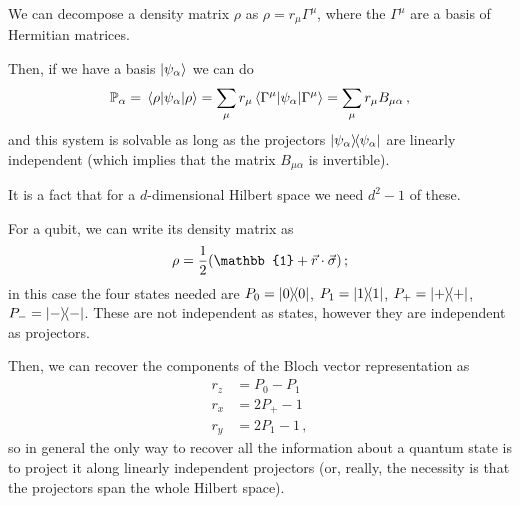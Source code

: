 \documentclass[main.tex]{subfiles}
\begin{document}
We can decompose a density matrix \(\rho \) as \(\rho = r_{\mu } \Gamma^{\mu }\), where the \(\Gamma^{\mu }\) are a basis of Hermitian matrices. 

Then, if we have a basis \(\ket{\psi_{\alpha }}\) we can do 
%
\begin{align}
\mathbb{P}_{\alpha } = \ev{\psi_{\alpha }}{\rho }
= \sum_{\mu } r_{\mu } \ev{\psi_{\alpha }}{\Gamma^{\mu }}
= \sum_{\mu } r_{\mu } B_{\mu \alpha }
\,,
\end{align}
%
and this system is solvable as long as the projectors \(\dyad{\psi_{\alpha }}\) are linearly independent (which implies that the matrix \(B_{\mu \alpha }\) is invertible). 

It is a fact that for a \(d\)-dimensional Hilbert space we need \(d^2-1\) of these. 

For a qubit, we can write its density matrix as 
%
\begin{align}
\rho = \frac{1}{2} \qty(\mathbb{1} + \vec{r} \cdot \vec{\sigma})
\,;
\end{align}
%
in this case the four states needed are \(P_0 = \dyad{0}\), \(P_1 = \dyad{1}\), \(P_{+} = \dyad{+}\), \(P_{-} = \dyad{-}\). 
These are not independent as states, however they are independent as projectors. 

Then, we can recover the components of the Bloch vector representation as 
%
\begin{align}
r_{z} &= P_0 - P_1  \\
r_{x} &= 2 P_{+} -1  \\
r_{y} &= 2 P_1 - 1
\,,
\end{align}
%
so in general the only way to recover all the information about a quantum state is to project it along linearly independent projectors (or, really, the necessity is that the projectors span the whole Hilbert space).
\end{document}
